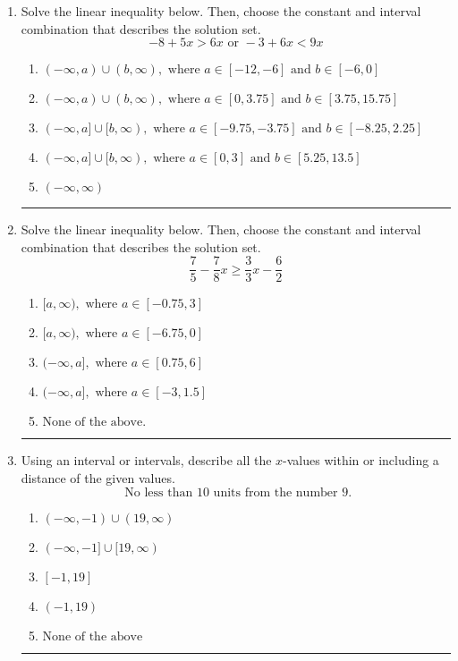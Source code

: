 \documentclass[14pt]{extbook}
\newcommand{\litem}[1]{\item#1\hspace*{-1cm}\rule{\textwidth}{0.4pt}}
\begin{document}
\begin{enumerate}
\litem{
Solve the linear inequality below. Then, choose the constant and interval combination that describes the solution set.\[ -8 + 5 x > 6 x \text{ or } -3 + 6 x < 9 x \]\begin{enumerate}[label=\Alph*.]
\item \( (-\infty, a) \cup (b, \infty), \text{ where } a \in [-12, -6] \text{ and } b \in [-6, 0] \)
\item \( (-\infty, a) \cup (b, \infty), \text{ where } a \in [0, 3.75] \text{ and } b \in [3.75, 15.75] \)
\item \( (-\infty, a] \cup [b, \infty), \text{ where } a \in [-9.75, -3.75] \text{ and } b \in [-8.25, 2.25] \)
\item \( (-\infty, a] \cup [b, \infty), \text{ where } a \in [0, 3] \text{ and } b \in [5.25, 13.5] \)
\item \( (-\infty, \infty) \)

\end{enumerate} }
\litem{
Solve the linear inequality below. Then, choose the constant and interval combination that describes the solution set.\[ \frac{7}{5} - \frac{7}{8} x \geq \frac{3}{3} x - \frac{6}{2} \]\begin{enumerate}[label=\Alph*.]
\item \( [a, \infty), \text{ where } a \in [-0.75, 3] \)
\item \( [a, \infty), \text{ where } a \in [-6.75, 0] \)
\item \( (-\infty, a], \text{ where } a \in [0.75, 6] \)
\item \( (-\infty, a], \text{ where } a \in [-3, 1.5] \)
\item \( \text{None of the above}. \)

\end{enumerate} }
\litem{
Using an interval or intervals, describe all the $x$-values within or including a distance of the given values.\[ \text{ No less than } 10 \text{ units from the number } 9. \]\begin{enumerate}[label=\Alph*.]
\item \( (-\infty, -1) \cup (19, \infty) \)
\item \( (-\infty, -1] \cup [19, \infty) \)
\item \( [-1, 19] \)
\item \( (-1, 19) \)
\item \( \text{None of the above} \)


\end{enumerate}}
\end{enumerate}
\end{document}
